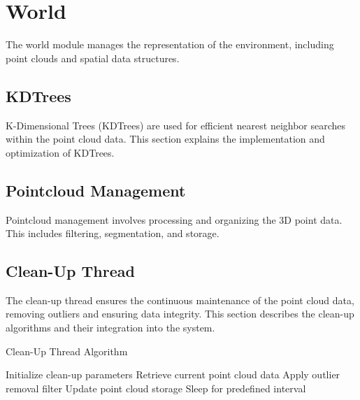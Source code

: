 \section{World}
The world module manages the representation of the environment, including point clouds and spatial data structures.

\subsection{KDTrees}
K-Dimensional Trees (KDTrees) are used for efficient nearest neighbor searches within the point cloud data. This section explains the implementation and optimization of KDTrees.

\subsection{Pointcloud Management}
Pointcloud management involves processing and organizing the 3D point data. This includes filtering, segmentation, and storage.

\subsection{Clean-Up Thread}
The clean-up thread ensures the continuous maintenance of the point cloud data, removing outliers and ensuring data integrity. This section describes the clean-up algorithms and their integration into the system.

\begin{algorithm}[h!]
\caption{Clean-Up Thread Algorithm}
\label{alg:cleanup}
\begin{algorithmic}[1]
\STATE Initialize clean-up parameters
    \STATE Retrieve current point cloud data
    \STATE Apply outlier removal filter
    \STATE Update point cloud storage
    \STATE Sleep for predefined interval
\ENDWHILE
\end{algorithmic}
\end{algorithm}
